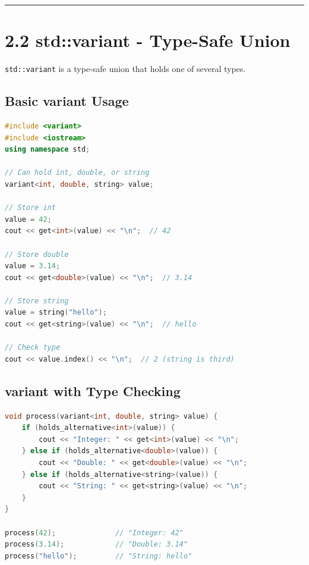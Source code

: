 \begin{center}\rule{0.5\linewidth}{0.5pt}\end{center}

\hypertarget{stdvariant---type-safe-union}{%
\section{2.2 std::variant - Type-Safe
Union}\label{stdvariant---type-safe-union}}

\passthrough{\lstinline!std::variant!} is a type-safe union that holds
one of several types.

\hypertarget{basic-variant-usage}{%
\subsection{Basic variant Usage}\label{basic-variant-usage}}

\begin{lstlisting}[language={C++}]
#include <variant>
#include <iostream>
using namespace std;

// Can hold int, double, or string
variant<int, double, string> value;

// Store int
value = 42;
cout << get<int>(value) << "\n";  // 42

// Store double
value = 3.14;
cout << get<double>(value) << "\n";  // 3.14

// Store string
value = string("hello");
cout << get<string>(value) << "\n";  // hello

// Check type
cout << value.index() << "\n";  // 2 (string is third)
\end{lstlisting}

\hypertarget{variant-with-type-checking}{%
\subsection{variant with Type
Checking}\label{variant-with-type-checking}}

\begin{lstlisting}[language={C++}]
void process(variant<int, double, string> value) {
    if (holds_alternative<int>(value)) {
        cout << "Integer: " << get<int>(value) << "\n";
    } else if (holds_alternative<double>(value)) {
        cout << "Double: " << get<double>(value) << "\n";
    } else if (holds_alternative<string>(value)) {
        cout << "String: " << get<string>(value) << "\n";
    }
}

process(42);              // "Integer: 42"
process(3.14);            // "Double: 3.14"
process("hello");         // "String: hello"
\end{lstlisting}

